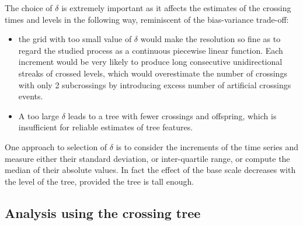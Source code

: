 \documentclass[a4paper]{article}
\begin{document}
The choice of $\delta$ is extremely important as it affects the estimates of the
crossing times and levels in the following way, reminiscent of the bias-variance
trade-off:
\begin{itemize}
    \item the grid with too small value of $\delta$ would make the resolution so
    fine as to regard the studied process as a continuous piecewise linear function.
    Each increment would be very likely to produce long consecutive unidirectional
    streaks of crossed levels, which would overestimate the number of crossings
    with only 2 subcrossings by introducing excess number of artificial crossings
    events.
    \item A too large $\delta$ leads to a tree with fewer crossings and offspring,
    which is insufficient for reliable estimates of tree features.
\end{itemize}
One approach to selection of $\delta$ is to consider the increments of the time
series and measure either their standard deviation, or inter-quartile range, or
compute the median of their absolute values. In fact the effect of the base scale
decreases with the level of the tree, provided the tree is tall enough.



\subsection{Analysis using the crossing tree} %
\label{sub:analysis_using_the_crossing_tree}
\end{document}
